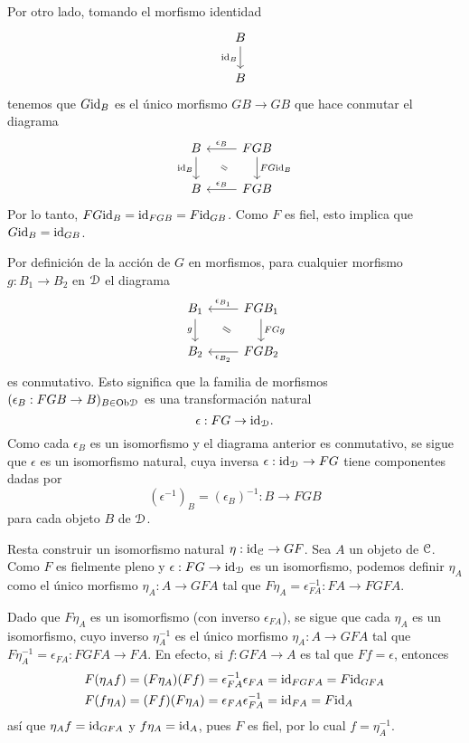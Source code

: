 \begin{sol}
    Por otro lado, tomando el morfismo identidad
    \[
        \begin{tikzcd}
            B \ar[d,"\id_B"'] \\
            B
        \end{tikzcd}
    \]
    tenemos que $G\id_B$ es el único morfismo $GB\to GB$ que hace conmutar
    el diagrama
    \[
        \begin{tikzcd}
            B \ar[d,"\id_B"'] & FGB \ar[l,"\epsilon_B"'] \ar[d,"FG\id_B"] \\
            B & FGB \ar[l,"\epsilon_B"']
            \com{1-1}{2-2}
        \end{tikzcd}
    \]
    Por lo tanto, $FG\id_B=\id_{FGB}=F\id_{GB}$.
    Como $F$ es fiel, esto implica que $G\id_B =\id_{GB}$.
    
    Por definición de la acción de $G$ en morfismos, para cualquier morfismo
    $g:B_1\to B_2$ en $\cal D$ el diagrama
    \[
        \begin{tikzcd}
            B_1 \ar[d,"g"']
            & FGB_1 \ar[l,"\epsilon_{B_1}"'] \ar[d,"FGg"] \\
            B_2 & FGB_2 \ar[l,"\epsilon_{B_2}"]
            \com{1-1}{2-2}
        \end{tikzcd}
    \]
    es conmutativo.
    Esto significa que la familia de morfismos $(\epsilon_B:FGB\to B)_{B\in\Ob\cal D}$
    es una transformación natural
    \[
        \epsilon : FG\to \id_{\cal D}
    .\]
    Como cada $\epsilon_B$ es un isomorfismo y el diagrama anterior
    es conmutativo, se sigue que $\epsilon$ es un
    isomorfismo natural, cuya inversa
    $\epsilon:\id_{\cal D}\to FG$ tiene componentes dadas por
    \[
        (\epsilon^{-1})_B = (\epsilon_B)^{-1}:B\to FGB
    \]
    para cada objeto $B$ de $\cal D$.
    
    Resta construir un isomorfismo natural $\eta:\id_{\cal C}\to GF$.
    Sea $A$ un objeto de $\cal C$.
    Como $F$ es fielmente pleno y $\epsilon:FG\to\id_{\cal D}$ es un
    isomorfismo, podemos definir $\eta_A$ como el único morfismo
    $\eta_A:A\to GFA$ tal que $F\eta_A=\epsilon_{FA}^{-1}:FA\to FGFA$.
    
    Dado que $F\eta_A$ es un isomorfismo (con inverso $\epsilon_{FA}$),
    se sigue que cada $\eta_A$ es un isomorfismo, cuyo inverso $\eta_A^{-1}$ es el
    único morfismo $\eta_A:A\to GFA$ tal que $F\eta_A^{-1}=\epsilon_{FA}:FGFA\to FA$.
    En efecto, si $f:GFA\to A$ es tal que $Ff=\epsilon$, entonces
    \begin{align*}
        F(\eta_Af)
        &=(F\eta_A)(Ff)=\epsilon_{FA}^{-1}\epsilon_{FA}=\id_{FGFA}=F\id_{GFA} \\
        F(f\eta_A)
        &=(Ff)(F\eta_A)=\epsilon_{FA}\epsilon_{FA}^{-1}=\id_{FA}=F\id_A
    \end{align*}
    así que $\eta_Af=\id_{GFA}$ y $f\eta_A=\id_A$, pues $F$ es fiel,
    por lo cual $f=\eta_A^{-1}$.
    

\end{sol}
